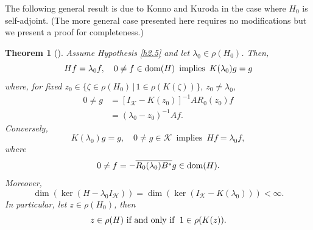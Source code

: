 \documentclass[reqno,10pt, centertags]{amsart}
\newcommand{\cH}{{\mathcal H}}
\newcommand{\cK}{{\mathcal K}}
\newcommand{\lb}{\label}
\newcommand{\ol}{\overline}
\newcommand{\dom}{\text{\rm{dom}}}
\numberwithin{equation}{section}
\newtheorem{theorem}{Theorem}[section]
\theoremstyle{definition}
\begin{document}
The following general result is due to Konno and Kuroda \cite{KK66}
in the case where $H_0$ is self-adjoint. (The more general case
presented here requires no modifications but we present a proof for
completeness.)
\begin{theorem}[\cite{KK66}] \lb{t2.6}
Assume Hypothesis \ref{h2.5} and let $\lambda_0\in\rho(H_0)$. Then,
\begin{equation}
Hf=\lambda_0 f, \quad 0\neq f\in\dom(H) \, \text{ implies } \,
K(\lambda_0)g=g \lb{2.29}
\end{equation}
where, for fixed $z_0\in\{\zeta\in\rho(H_0)\,|\,
1\in\rho(K(\zeta))\}$, $z_0\neq \lambda_0$,
\begin{align}
0 \neq g &= [I_{\cK}-K(z_0)]^{-1}AR_0(z_0)f \lb{2.30} \\
&= (\lambda_0-z_0)^{-1}Af. \lb{2.30a}
\end{align}
Conversely,
\begin{equation}
K(\lambda_0)g=g, \quad 0\neq g\in\cK \, \text{ implies } \,
Hf=\lambda_0 f, \lb{2.31}
\end{equation}
where
\begin{equation}
0\neq f=-\ol{R_0(\lambda_0)B^*}g\in\dom(H). \lb{2.32}
\end{equation}
Moreover,
\begin{equation}
\dim(\ker(H-\lambda_0I_{\cH}))
=\dim(\ker(I_{\cK}-K(\lambda_0)))<\infty.
\lb{2.33}
\end{equation}
In particular, let $z\in\rho(H_0)$, then
\begin{equation}
\text{$z\in\rho(H)$ if and only if\;
$1\in\rho(K(z))$.} \lb{2.33a}
\end{equation}
\end{theorem}
\end{document}
